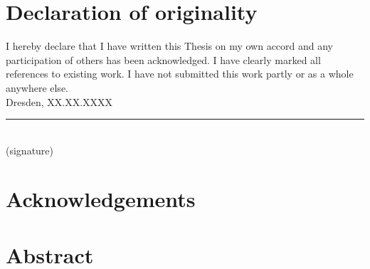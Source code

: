 \documentclass[12 pt, a4paper]{report}
\theoremstyle{definition}
\newcommand{\blankpage}{
\newpage
\thispagestyle{empty}
\addtocounter{page}{-1}
\mbox{}
\newpage
}
\begin{document}
\sloppy

\blankpage

\chapter*{Declaration of originality}
I hereby declare that I have written this Thesis on my own accord and any participation of others has been acknowledged. I have clearly marked all references to existing work. I have not submitted this work partly or as a whole anywhere else. \\

Dresden, XX.XX.XXXX \\
\rule{150 px}{0.5 px} \\
(signature)
\blankpage

\chapter*{Acknowledgements}
\lipsum[1]
\blankpage

%

\chapter*{Abstract}
\lipsum[1]

\tableofcontents
\pagebreak

{}


\end{document}
